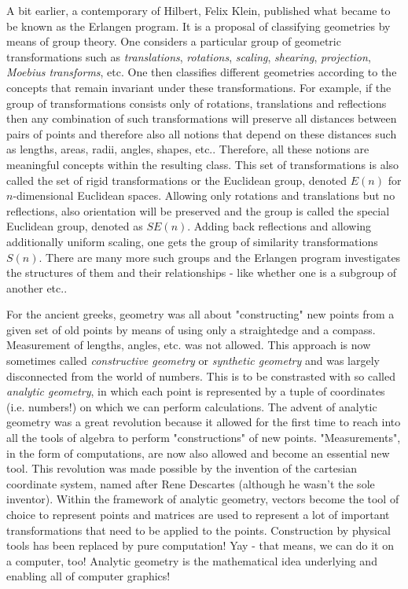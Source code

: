 \medskip
A bit earlier, a contemporary of Hilbert, Felix Klein, published what became to be known as the Erlangen program. It is a proposal of classifying geometries by means of group theory. One considers a particular group of geometric transformations such as \emph{translations}, \emph{rotations}, \emph{scaling}, \emph{shearing}, \emph{projection}, \emph{Moebius transforms}, etc. One then classifies different geometries according to the concepts that remain invariant under these transformations. For example, if the group of transformations consists only of rotations, translations and reflections then any combination of such transformations will preserve all distances between pairs of points and therefore also all notions that depend on these distances such as lengths, areas, radii, angles, shapes, etc.. Therefore, all these notions are meaningful concepts within the resulting class. This set of transformations is also called the set of rigid transformations or the Euclidean group, denoted $E(n)$ for $n$-dimensional Euclidean spaces. Allowing only rotations and translations but no reflections, also orientation will be preserved and the group is called the special Euclidean group, denoted as $SE(n)$. Adding back reflections and allowing additionally uniform scaling, one gets the group of similarity transformations $S(n)$. There are many more such groups and the Erlangen program investigates the structures of them and their relationships - like whether one is a subgroup of another etc..


\medskip
For the ancient greeks, geometry was all about "constructing" new points from a given set of old points by means of using only a straightedge and a compass. Measurement of lengths, angles, etc. was not allowed. This approach is now sometimes called \emph{constructive geometry} or \emph{synthetic geometry} and was largely disconnected from the world of numbers. This is to be constrasted with so called \emph{analytic geometry}, in which each point is represented by a tuple of coordinates (i.e. numbers!) on which we can perform calculations. The advent of analytic geometry was a great revolution because it allowed for the first time to reach into all the tools of algebra to perform "constructions" of new points. "Measurements", in the form of computations, are now also allowed and become an essential new tool. This revolution was made possible by the invention of the cartesian coordinate system, named after Rene Descartes (although he wasn't the sole inventor). Within the framework of analytic geometry, vectors become the tool of choice to represent points and matrices are used to represent a lot of important transformations that need to be applied to the points. Construction by physical tools has been replaced by pure computation! Yay - that means, we can do it on a computer, too! Analytic geometry is the mathematical idea underlying and enabling all of computer graphics!

